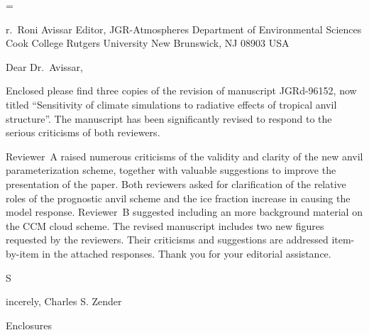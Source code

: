 
\magnification=

\addressdefine
\formalletterhead

\address
Dr.~Roni Avissar
Editor, JGR-Atmospheres
Department of Environmental Sciences
Cook College
Rutgers University
New Brunswick, NJ 08903 USA

\body
Dear Dr.~Avissar,

Enclosed please find three copies of the revision of manuscript
JGRd-96152, now titled ``Sensitivity of climate simulations to
radiative effects of tropical anvil structure''.
The manuscript has been significantly revised to respond to the
serious criticisms of both reviewers. 

Reviewer~A raised numerous criticisms of the validity and clarity of
the new anvil parameterization scheme, together with valuable
suggestions to improve the presentation of the paper.
Both reviewers asked for clarification of the relative roles of the
prognostic anvil scheme and the ice fraction increase in causing the
model response. 
Reviewer~B suggested including an more background material on the CCM
cloud scheme. 
The revised manuscript includes two new figures requested by the
reviewers.
Their criticisms and suggestions are addressed item-by-item in the
attached responses. 
Thank you for your editorial assistance.

\closing 
Sincerely,
Charles S. Zender

\annotations %
Enclosures


\endletter %
\bye %
